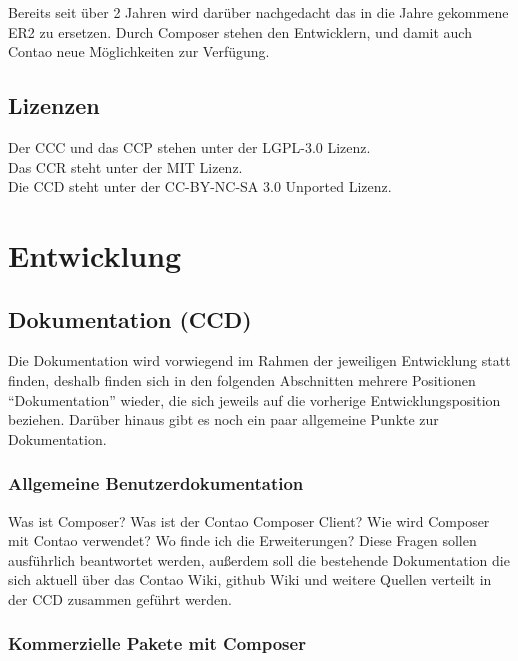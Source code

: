 \documentclass[
paper=a4,
draft=false,%
fontsize=10pt%
]{scrartcl}
\begin{document}
Bereits seit über 2 Jahren wird darüber nachgedacht das in die Jahre gekommene ER2 zu ersetzen. Durch Composer stehen den Entwicklern, und damit auch Contao neue Möglichkeiten zur Verfügung.

\subsection{Lizenzen}

Der CCC und das CCP stehen unter der LGPL-3.0 Lizenz. \\
Das CCR steht unter der MIT Lizenz. \\
Die CCD steht unter der CC-BY-NC-SA 3.0 Unported Lizenz.

%
%

\newpage

\section{Entwicklung}

\subsection{Dokumentation (CCD)}

Die Dokumentation wird vorwiegend im Rahmen der jeweiligen Entwicklung statt finden, deshalb finden sich in den folgenden Abschnitten mehrere Positionen “Dokumentation” wieder, die sich jeweils auf die vorherige Entwicklungsposition beziehen. Darüber hinaus gibt es noch ein paar allgemeine Punkte zur Dokumentation.

\subsubsection{Allgemeine Benutzerdokumentation}

Was ist Composer? Was ist der Contao Composer Client? Wie wird Composer mit Contao verwendet? Wo finde ich die Erweiterungen?
Diese Fragen sollen ausführlich beantwortet werden, außerdem soll die bestehende Dokumentation die sich aktuell über das Contao Wiki, github Wiki und weitere Quellen verteilt in der CCD zusammen geführt werden.

\subsubsection{Kommerzielle Pakete mit Composer}
\end{document}
